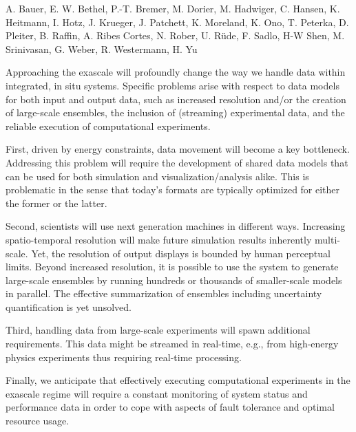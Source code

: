 \license

 A. Bauer, E. W. Bethel, P.-T. Bremer, M. Dorier, M. Hadwiger, C. Hansen, K. Heitmann, I. Hotz, J. Krueger, J. Patchett, K. Moreland, K. Ono, T. Peterka, D. Pleiter, B. Raffin, A. Ribes Cortes, N. Rober, U. R\"ude, F. Sadlo, H-W Shen, M. Srinivasan, G. Weber, R. Westermann, H. Yu

\begin{refsection}

Approaching the exascale will profoundly change the way we handle data within integrated, in situ systems. 
Specific problems arise with respect to data models for both input and output data, such as increased resolution and/or the creation of large-scale ensembles, the inclusion of (streaming) experimental data, and the reliable execution of computational experiments.

First, driven by energy constraints, data movement will become a key bottleneck. 
Addressing this problem will require the development of shared data models that can be used for both simulation and visualization/analysis alike. 
This is problematic in the sense that today’s formats are typically optimized for either the former or the latter. 

Second, scientists will use next generation machines in different ways. 
Increasing spatio-temporal resolution will make future simulation results inherently multi-scale. 
Yet, the resolution of output displays is bounded by human perceptual limits.
Beyond increased resolution, it is possible to use the system to generate large-scale ensembles by running hundreds or thousands of smaller-scale models in parallel. 
The effective summarization of ensembles including uncertainty quantification is yet unsolved. 

Third, handling data from large-scale experiments will spawn additional requirements. 
This data might be streamed in real-time, e.g., from high-energy physics experiments thus requiring real-time processing. 

Finally, we anticipate that effectively executing computational experiments in the exascale regime will require a constant monitoring of system status and performance data in order to cope with aspects of fault tolerance and optimal resource usage.


\end{refsection}
